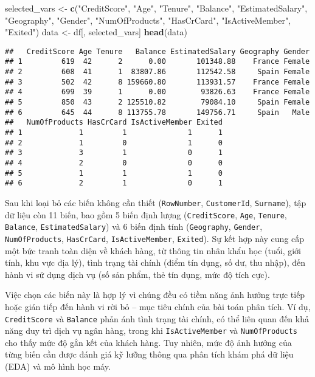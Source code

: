 \documentclass[
]{article}
\newenvironment{Shaded}{\begin{snugshade}}{\end{snugshade}}
\newcommand{\FunctionTok}[1]{\textcolor[rgb]{0.13,0.29,0.53}{\textbf{#1}}}
\newcommand{\NormalTok}[1]{#1}
\newcommand{\OtherTok}[1]{\textcolor[rgb]{0.56,0.35,0.01}{#1}}
\newcommand{\StringTok}[1]{\textcolor[rgb]{0.31,0.60,0.02}{#1}}
\begin{document}
\begin{Shaded}
\begin{Highlighting}[]
\NormalTok{selected\_vars }\OtherTok{\textless{}{-}} \FunctionTok{c}\NormalTok{(}\StringTok{"CreditScore"}\NormalTok{, }\StringTok{"Age"}\NormalTok{, }\StringTok{"Tenure"}\NormalTok{, }\StringTok{"Balance"}\NormalTok{, }\StringTok{"EstimatedSalary"}\NormalTok{, }
                   \StringTok{"Geography"}\NormalTok{, }\StringTok{"Gender"}\NormalTok{, }\StringTok{"NumOfProducts"}\NormalTok{, }\StringTok{"HasCrCard"}\NormalTok{, }\StringTok{"IsActiveMember"}\NormalTok{, }\StringTok{"Exited"}\NormalTok{)}
\NormalTok{data }\OtherTok{\textless{}{-}}\NormalTok{ df[, selected\_vars]}
\FunctionTok{head}\NormalTok{(data)}
\end{Highlighting}
\end{Shaded}

\begin{verbatim}
##   CreditScore Age Tenure   Balance EstimatedSalary Geography Gender
## 1         619  42      2      0.00       101348.88    France Female
## 2         608  41      1  83807.86       112542.58     Spain Female
## 3         502  42      8 159660.80       113931.57    France Female
## 4         699  39      1      0.00        93826.63    France Female
## 5         850  43      2 125510.82        79084.10     Spain Female
## 6         645  44      8 113755.78       149756.71     Spain   Male
##   NumOfProducts HasCrCard IsActiveMember Exited
## 1             1         1              1      1
## 2             1         0              1      0
## 3             3         1              0      1
## 4             2         0              0      0
## 5             1         1              1      0
## 6             2         1              0      1
\end{verbatim}

Sau khi loại bỏ các biến không cần thiết (\texttt{RowNumber},
\texttt{CustomerId}, \texttt{Surname}), tập dữ liệu còn 11 biến, bao gồm
5 biến định lượng (\texttt{CreditScore}, \texttt{Age}, \texttt{Tenure},
\texttt{Balance}, \texttt{EstimatedSalary}) và 6 biến định tính
(\texttt{Geography}, \texttt{Gender}, \texttt{NumOfProducts},
\texttt{HasCrCard}, \texttt{IsActiveMember}, \texttt{Exited}). Sự kết
hợp này cung cấp một bức tranh toàn diện về khách hàng, từ thông tin
nhân khẩu học (tuổi, giới tính, khu vực địa lý), tình trạng tài chính
(điểm tín dụng, số dư, thu nhập), đến hành vi sử dụng dịch vụ (số sản
phẩm, thẻ tín dụng, mức độ tích cực).

Việc chọn các biến này là hợp lý vì chúng đều có tiềm năng ảnh hưởng
trực tiếp hoặc gián tiếp đến hành vi rời bỏ -- mục tiêu chính của bài
toán phân tích. Ví dụ, \texttt{CreditScore} và \texttt{Balance} phản ánh
tình trạng tài chính, có thể liên quan đến khả năng duy trì dịch vụ ngân
hàng, trong khi \texttt{IsActiveMember} và \texttt{NumOfProducts} cho
thấy mức độ gắn kết của khách hàng. Tuy nhiên, mức độ ảnh hưởng của từng
biến cần được đánh giá kỹ lưỡng thông qua phân tích khám phá dữ liệu
(EDA) và mô hình học máy.
\end{document}
